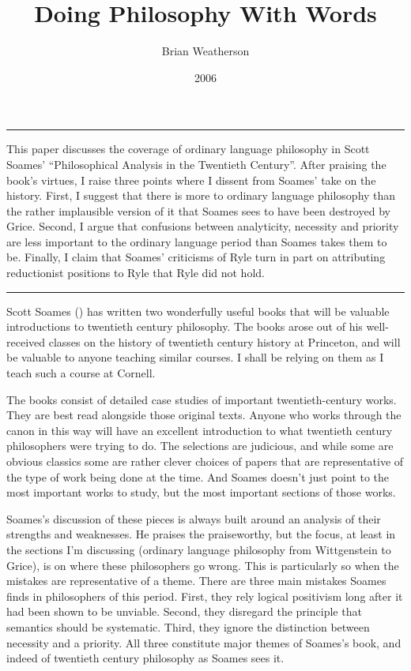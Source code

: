 \documentclass[
  10pt,
  letterpaper,
  DIV=11,
  numbers=noendperiod,
  twoside]{scrartcl}
\title{Doing Philosophy With Words}
\author{Brian Weatherson}
\date{2006}
\renewenvironment{abstract}
 {\vspace{-1.25cm}
 \quotation\small\noindent\rule{\linewidth}{.5pt}\par\smallskip
 \noindent }
 {\par\noindent\rule{\linewidth}{.5pt}\endquotation}
\begin{document}
\maketitle
\begin{abstract}
This paper discusses the coverage of ordinary language philosophy in
Scott Soames' ``Philosophical Analysis in the Twentieth Century''. After
praising the book's virtues, I raise three points where I dissent from
Soames' take on the history. First, I suggest that there is more to
ordinary language philosophy than the rather implausible version of it
that Soames sees to have been destroyed by Grice. Second, I argue that
confusions between analyticity, necessity and priority are less
important to the ordinary language period than Soames takes them to be.
Finally, I claim that Soames' criticisms of Ryle turn in part on
attributing reductionist positions to Ryle that Ryle did not hold.
\end{abstract}


Scott Soames () has written two
wonderfully useful books that will be valuable introductions to
twentieth century philosophy. The books arose out of his well-received
classes on the history of twentieth century history at Princeton, and
will be valuable to anyone teaching similar courses. I shall be relying
on them as I teach such a course at Cornell.

The books consist of detailed case studies of important
twentieth-century works. They are best read alongside those original
texts. Anyone who works through the canon in this way will have an
excellent introduction to what twentieth century philosophers were
trying to do. The selections are judicious, and while some are obvious
classics some are rather clever choices of papers that are
representative of the type of work being done at the time. And Soames
doesn't just point to the most important works to study, but the most
important sections of those works.

Soames's discussion of these pieces is always built around an analysis
of their strengths and weaknesses. He praises the praiseworthy, but the
focus, at least in the sections I'm discussing (ordinary language
philosophy from Wittgenstein to Grice), is on where these philosophers
go wrong. This is particularly so when the mistakes are representative
of a theme. There are three main mistakes Soames finds in philosophers
of this period. First, they rely logical positivism long after it had
been shown to be unviable. Second, they disregard the principle that
semantics should be systematic. Third, they ignore the distinction
between necessity and a priority. All three constitute major themes of
Soames's book, and indeed of twentieth century philosophy as Soames sees
it.
\end{document}
